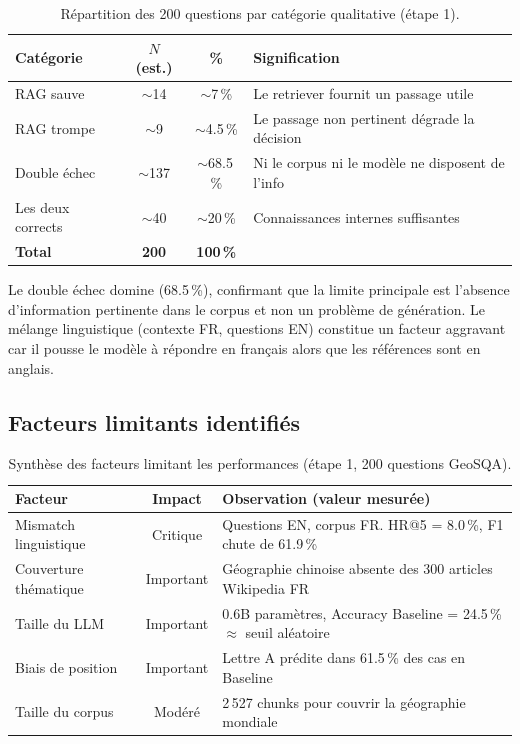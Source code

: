 \documentclass[12pt,a4paper]{article}
\begin{document}
\begin{table}[H]
\centering
\caption{R\'epartition des 200 questions par cat\'egorie qualitative (\'etape 1).}
\label{tab:qualitative_p1}
\begin{tabular}{@{} l c c p{7cm} @{}}
\toprule
\textbf{Cat\'egorie} & \textbf{$N$ (est.)} & \textbf{\%}
  & \textbf{Signification} \\
\midrule
\rowcolor{green!8}
RAG sauve     & $\sim$14 & $\sim$7\,\%
  & Le retriever fournit un passage utile \\
\rowcolor{red!6}
RAG trompe    & $\sim$9  & $\sim$4.5\,\%
  & Le passage non pertinent d\'egrade la d\'ecision \\
\rowcolor{gray!8}
Double \'echec  & $\sim$137 & $\sim$68.5\,\%
  & Ni le corpus ni le mod\`ele ne disposent de l'info \\
Les deux corrects     & $\sim$40  & $\sim$20\,\%
  & Connaissances internes suffisantes \\
\midrule
\textbf{Total} & \textbf{200} & \textbf{100\,\%} & \\
\bottomrule
\end{tabular}
\end{table}

Le double \'echec domine (68.5\,\%), confirmant que la limite principale est l'absence d'information pertinente dans le corpus et non un probl\`eme de g\'en\'eration. Le m\'elange linguistique (contexte FR, questions EN) constitue un facteur aggravant car il pousse le mod\`ele \`a r\'epondre en fran\c{c}ais alors que les r\'ef\'erences sont en anglais.

\subsection{Facteurs limitants identifi\'es}

\begin{table}[H]
\centering
\caption{Synth\`ese des facteurs limitant les performances (\'etape 1, 200 questions GeoSQA).}
\label{tab:facteurs_p1}
\begin{tabularx}{\textwidth}{@{} l c X @{}}
\toprule
\textbf{Facteur} & \textbf{Impact} & \textbf{Observation (valeur mesur\'ee)} \\
\midrule
Mismatch linguistique
  & \cellcolor{criticalred!20}Critique
  & Questions EN, corpus FR. HR@5 = 8.0\,\%, F1 chute de 61.9\,\% \\
\rowcolor{lightgray}
Couverture th\'ematique
  & \cellcolor{importantyellow!30}Important
  & G\'eographie chinoise absente des 300 articles Wikipedia FR \\
Taille du LLM
  & \cellcolor{importantyellow!30}Important
  & 0.6B param\`etres, Accuracy Baseline = 24.5\,\% $\approx$ seuil al\'eatoire \\
\rowcolor{lightgray}
Biais de position
  & \cellcolor{importantyellow!30}Important
  & Lettre A pr\'edite dans 61.5\,\% des cas en Baseline \\
Taille du corpus
  & \cellcolor{moderategray!20}Mod\'er\'e
  & 2\,527 chunks pour couvrir la g\'eographie mondiale \\
\bottomrule
\end{tabularx}
\end{table}
\end{document}
